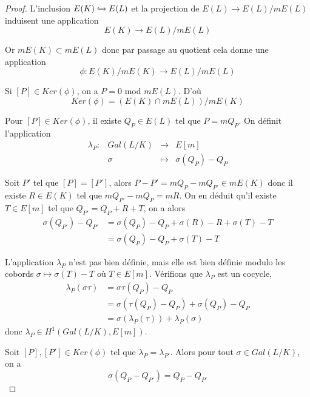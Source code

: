 \documentclass{article}
\begin{document}
\begin{proof}
L'inclusion $E(K) \xhookrightarrow{} E(L)$ et la projection de $E(L) \longrightarrow E(L)/mE(L)$ induisent une application
\begin{equation*}
E(K) \longrightarrow E(L)/mE(L)
\end{equation*}

Or $mE(K) \subset mE(L)$ donc par passage au quotient cela donne une application
\begin{equation*}
\phi : E(K)/mE(K) \longrightarrow E(L)/mE(L)
\end{equation*}

Si $[P]\in Ker(\phi)$, on a $P = 0$ mod $mE(L)$. D'où
\begin{equation*}
Ker(\phi) = (E(K)\cap mE(L))/mE(K)
\end{equation*}

Pour $[P]\in Ker(\phi)$, il existe $Q_{P}\in E(L)$ tel que $P=mQ_{P}$. On définit l'application
\begin{equation*}
\begin{array}{lrcl}
\lambda_{P} :&Gal(L/K) & \longrightarrow & E[m] \\
	 & \sigma & \longmapsto & \sigma(Q_{P}) - Q_{P}
\end{array}
\end{equation*}

Soit $P'$ tel que $[P]=[P']$, alors $P-P'=mQ_{P}-mQ_{P'}\in mE(K)$
donc il existe $R\in E(K)$ tel que $mQ_{P'} - mQ_{P} = mR$. On en déduit qu'il existe
$T\in E[m]$ tel que $Q_{P'} = Q_{P} + R + T$, on a alors
\begin{align*}
\sigma(Q_{P'}) - Q_{P'} &= \sigma(Q_{P}) - Q_{P} + \sigma(R) - R + \sigma(T) - T\\
			&= \sigma(Q_{P}) - Q_{P} + \sigma(T) - T
\end{align*}

L'application $\lambda_{P}$ n'est pas bien définie, mais elle est bien définie modulo les cobords
$\sigma \longmapsto \sigma(T) - T$ où $T\in E[m]$. Vérifions que $\lambda_{P}$ est un cocycle,
\begin{align*}
\lambda_{P}(\sigma \tau) &= \sigma \tau(Q_{P}) - Q_{P} \\
			&= \sigma(\tau(Q_{P}) - Q_{P}) + \sigma(Q_{P}) - Q_{P} \\
			&= \sigma(\lambda_{P}(\tau)) + \lambda_{P}(\sigma)
\end{align*}
donc $\lambda_{P} \in H^1(Gal(L/K), E[m])$.

Soit $[P], [P'] \in Ker(\phi)$ tel que $\lambda_{P}=\lambda_{P'}$.
Alors pour tout $\sigma \in Gal(L/K)$, on a
\begin{equation*}
\sigma(Q_{P}-Q_{P'}) = Q_{P} - Q_{P'}
\end{equation*}


\end{proof}
\end{document}
